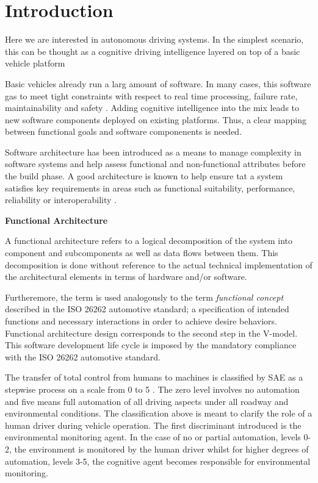 \section{Introduction}
\label{introduction}

Here we are interested in autonomous driving systems. In the simplest scenario, this can be thought as a cognitive driving intelligence layered on top of a basic vehicle platform

Basic vehicles already run a larg amount of software. In many cases, this software gas to meet tight constraints with respect to real time processing,
failure rate, maintainability and safety \cite{Serban}. Adding cognitive intelligence into the mix leads to new software components deployed on existing platforms.
Thus, a clear mapping between functional goals and software componenents is needed. 

Software architecture has been introduced  as a means to manage complexity in software systems and help assess functional and non-functional attributes before the 
build phase. A good architecture is known to help ensure tat a system satisfies key requirements in areas such as functional suitability, performance,
reliability or interoperability \cite{Garlan2000}. 


\begin{framed}
\theoremstyle{remark}
\begin{remark}{\textbf{Functional Architecture}}

A functional architecture refers to a logical decomposition of the system into component and subcomponents as well as data flows between them.  
This decomposition is done without reference to the actual technical implementation of the architectural elements in terms of hardware and/or software.

Furtheremore, the term is used analogously to the term {\em functional concept} described in the ISO 26262 automotive standard; a specification
of intended functions and necessary interactions in order to achieve desire behaviors. Functional architecture design corresponds to the second
step in the V-model. This software development life cycle is imposed by the mandatory compliance with the ISO 26262 automotive standard.

\end{remark}
\end{framed}

The transfer of total control from humans to machines is classified by SAE as a stepwise process on a scale from 0 to 5 \cite{Serban}.
The zero level involves no automation and five means full automation of all driving aspects under all roadway and environmental conditions.
The classification above is meant to clarify the role of a human driver during vehicle operation. The first discriminant introduced is the 
environmental monitoring agent. In the case of no or partial automation, levels 0-2, the environment is monitored by the human driver whilst for higher
degrees of automation, levels 3-5, the cognitive agent becomes responsible for environmental monitoring.

